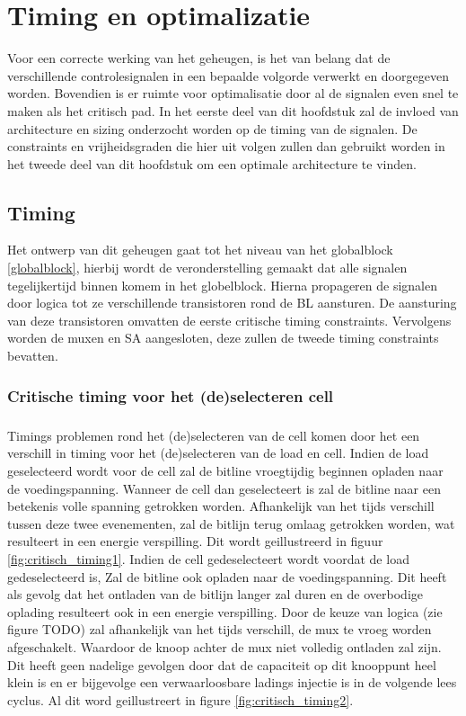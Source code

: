 \chapter{Timing en optimalizatie}
\label{timing-optimization}
Voor een correcte werking van het geheugen, is het van belang dat de verschillende controlesignalen in een bepaalde volgorde verwerkt en doorgegeven worden.
Bovendien is er ruimte voor optimalisatie door al de signalen even snel te maken als het critisch pad. In het eerste deel van dit hoofdstuk zal de invloed van architecture en sizing onderzocht worden op de timing van de signalen. De constraints en vrijheidsgraden die hier uit volgen zullen dan gebruikt worden in het tweede deel van dit hoofdstuk om een optimale architecture te vinden.

\section{Timing}
Het ontwerp van dit geheugen gaat tot het niveau van het globalblock \ref{globalblock}, hierbij wordt de veronderstelling gemaakt dat alle signalen tegelijkertijd binnen komem in het globelblock. Hierna propageren de signalen door logica tot ze verschillende transistoren rond de BL aansturen. De aansturing van deze transistoren omvatten de eerste critische timing constraints. Vervolgens worden de muxen en SA aangesloten, deze zullen de tweede timing constraints bevatten.

\subsection{Critische timing voor het (de)selecteren cell}
\paragraph{}
Timings problemen rond het (de)selecteren van de cell komen door het een verschill in timing voor het (de)selecteren van de load en cell. Indien de load geselecteerd wordt voor de cell zal de bitline vroegtijdig beginnen opladen naar de voedingspanning. Wanneer de cell dan geselecteert is zal de bitline naar een betekenis volle spanning getrokken worden. Afhankelijk van het tijds verschill tussen deze twee evenementen, zal de bitlijn terug omlaag getrokken worden, wat resulteert in een energie verspilling. Dit wordt geillustreerd in figuur \ref{fig:critisch_timing1}. Indien de cell gedeselecteert wordt voordat de load gedeselecteerd is, Zal de bitline ook opladen naar de voedingspanning. Dit heeft als gevolg dat het ontladen van de bitlijn langer zal duren en de overbodige oplading resulteert ook in een energie verspilling. Door de keuze van logica (zie figure TODO) zal afhankelijk van het tijds verschill, de mux te vroeg worden afgeschakelt. Waardoor de knoop achter de mux niet volledig ontladen zal zijn. Dit heeft geen nadelige gevolgen door dat de capaciteit op dit knooppunt heel klein is en er bijgevolge een verwaarloosbare ladings injectie is in de volgende lees cyclus. Al dit word geillustreert in figure \ref{fig:critisch_timing2}.  


